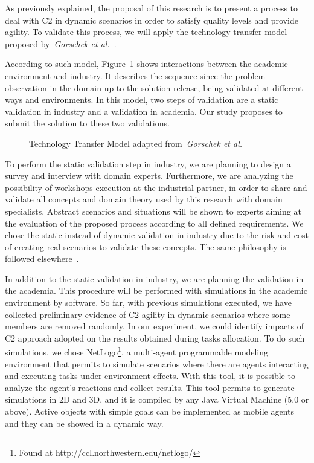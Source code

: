As previously explained, the proposal of this research is to present a process to deal with C2 in dynamic scenarios in order to satisfy quality levels and provide agility. To validate this process, we will apply the technology transfer model proposed by~\textit{Gorschek et al.}~\cite{transf01}. 

According to such model, Figure~\ref{valid} shows interactions between the academic environment and industry. It describes the sequence since the problem observation in the domain up to the solution release, being validated at different ways and environments. In this model, two steps of validation are a static validation in industry and a validation in academia. Our study proposes to submit the solution to these two validations. 

\begin{figure}
\centering
\scalebox{.8}{}
\label{valid}
\caption{Technology Transfer Model adapted from~\textit{Gorschek et al.}~\cite{transf01}}
\end{figure}

To perform the static validation step in industry, we are planning to design a survey and interview with domain experts. Furthermore, we are analyzing the possibility of workshops execution at the industrial partner, in order to share and validate all concepts and domain theory used by this research with domain specialists. Abstract scenarios and situations will be shown to experts aiming at the evaluation of the proposed process  according to all  defined requirements. We chose the static instead of dynamic validation in industry due to the risk and cost of creating real scenarios to validate these concepts. The same philosophy is followed elsewhere~\cite{FRANCE2014}.

In addition to the static validation in industry, we are planning the validation in the academia. This procedure will be performed with simulations in the academic environment by software.
So far, with previous simulations executed, we have collected  preliminary evidence of C2 agility in dynamic scenarios where some members are removed randomly. In our experiment, we could identify impacts of C2 approach adopted on the results obtained during tasks allocation. 
To do such simulations, we chose NetLogo\footnote{Found at http://ccl.northwestern.edu/netlogo/}, a multi-agent programmable modeling environment that permits to simulate scenarios where there are agents interacting and executing tasks under environment effects. With this tool, it is possible to analyze the agent's reactions and collect results. This tool permits to generate simulations in 2D and 3D, and it is compiled by any Java Virtual Machine (5.0 or above). Active objects with simple goals can be implemented as mobile agents and they can be showed in a dynamic way.

